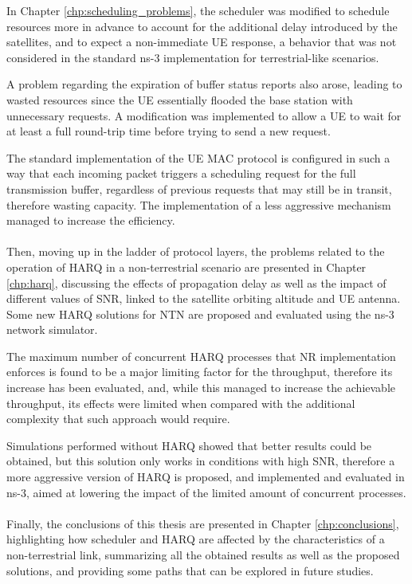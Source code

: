In Chapter \ref{chp:scheduling_problems}, the scheduler was modified to schedule resources more in advance to account for the additional delay introduced by the satellites, and to expect a non-immediate \ac{UE} response, a behavior that was not considered in the standard ns-3 implementation for terrestrial-like scenarios.

A problem regarding the expiration of buffer status reports also arose, leading to wasted resources since the \ac{UE} essentially flooded the base station with unnecessary requests. A modification was implemented to allow a \ac{UE} to wait for at least a full round-trip time before trying to send a new request.

The standard implementation of the \ac{UE} MAC protocol is configured in such a way that each incoming packet triggers a scheduling request for the full transmission buffer, regardless of previous requests that may still be in transit, therefore wasting capacity. The implementation of a less aggressive mechanism managed to increase the efficiency.


\paragraph{}
Then, moving up in the ladder of protocol layers, the problems related to the operation of \ac{HARQ} in a non-terrestrial scenario are presented in Chapter \ref{chp:harq}, discussing the effects of propagation delay as well as the impact of different values of SNR, linked to the satellite orbiting altitude and \ac{UE} antenna. Some new \ac{HARQ} solutions for \ac{NTN} are proposed and evaluated using the ns-3 network simulator.

The maximum number of concurrent \ac{HARQ} processes that \ac{NR} implementation enforces is found to be a major limiting factor for the throughput, therefore its increase has been evaluated, and, while this managed to increase the achievable throughput, its effects were limited when compared with the additional complexity that such approach would require.

Simulations performed without \ac{HARQ} showed that better results could be obtained, but this solution only works in conditions with high SNR, therefore a more aggressive version of \ac{HARQ} is proposed, and implemented and evaluated in ns-3, aimed at lowering the impact of the limited amount of concurrent processes.

\paragraph{}
Finally, the conclusions of this thesis are presented in Chapter \ref{chp:conclusions}, highlighting how scheduler and \ac{HARQ} are affected by the characteristics of a non-terrestrial link, summarizing all the obtained results as well as the proposed solutions, and providing some paths that can be explored in future studies.